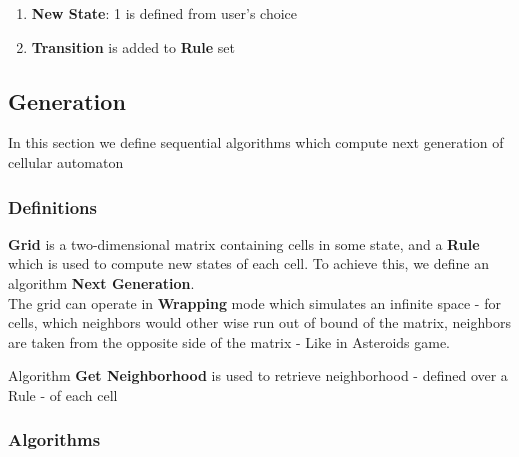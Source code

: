 \documentclass{article}
\begin{document}
\begin{itemize}
\begin{enumerate}
\begin{enumerate}
		\item {\bf New State}: 1 is defined from user's choice
		
		\item {\bf Transition} is added to {\bf Rule} set
			
	\end{enumerate}	
\end{enumerate}

\end{itemize}

\subsection{Generation}

In this section we define sequential algorithms which compute next generation
of cellular automaton

\subsubsection{Definitions}

{\bf Grid} is a two-dimensional matrix containing cells in some state, and a {\bf Rule}
which is used to compute new states of each cell. 
To achieve this, we define an algorithm {\bf Next Generation}.\\
The grid can operate in {\bf Wrapping} mode
which simulates an infinite space - for cells, which neighbors would other wise run out of
bound of the matrix, neighbors are taken from the opposite side of the matrix - Like in Asteroids game.

Algorithm {\bf Get Neighborhood} is used to retrieve neighborhood - defined
over a Rule - of each cell

\subsubsection{Algorithms}
\end{document}
